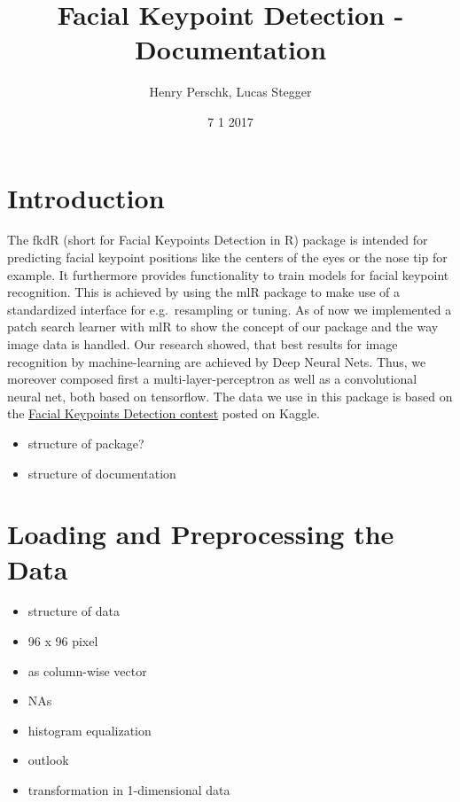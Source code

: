 \documentclass[]{article}
\title{Facial Keypoint Detection - Documentation}
\author{Henry Perschk, Lucas Stegger}
\date{7 1 2017}
\providecommand{\tightlist}{%
  \setlength{\itemsep}{0pt}\setlength{\parskip}{0pt}}
\begin{document}
\maketitle

{
\setcounter{tocdepth}{2}
\tableofcontents
}
\section{Introduction}\label{introduction}

The fkdR (short for Facial Keypoints Detection in R) package is intended
for predicting facial keypoint positions like the centers of the eyes or
the nose tip for example. It furthermore provides functionality to train
models for facial keypoint recognition. This is achieved by using the
mlR package to make use of a standardized interface for e.g.~resampling
or tuning. As of now we implemented a patch search learner with mlR to
show the concept of our package and the way image data is handled. Our
research showed, that best results for image recognition by
machine-learning are achieved by Deep Neural Nets. Thus, we moreover
composed first a multi-layer-perceptron as well as a convolutional
neural net, both based on tensorflow. The data we use in this package is
based on the
\href{https://www.kaggle.com/c/facial-keypoints-detection}{Facial
Keypoints Detection contest} posted on Kaggle.

\begin{itemize}
\tightlist
\item
  structure of package?
\item
  structure of documentation
\end{itemize}

\section{Loading and Preprocessing the
Data}\label{loading-and-preprocessing-the-data}

\begin{itemize}
\tightlist
\item
  structure of data
\item
  96 x 96 pixel
\item
  as column-wise vector
\item
  NAs
\item
  histogram equalization
\item
  outlook
\item
  transformation in 1-dimensional data
\end{itemize}
\end{document}
